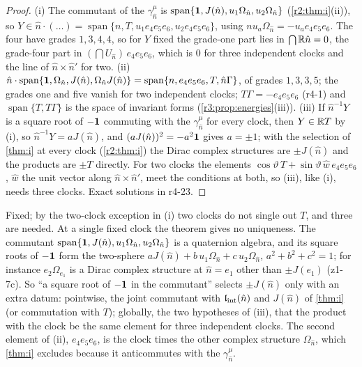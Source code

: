 \begin{proof}
(i) The commutant of the $\gamma^\mu_{\hat n}$ is $\operatorname{span}\{\mathbf 1,J(\hat n),u_1\Omega_{\hat n},u_2\Omega_{\hat n}\}$ (\cref{r2:thm:i}(ii)), so $Y\in \hat n\cdot(\ldots)=\operatorname{span}\{n,T,u_1e_4e_5e_6,u_2e_4e_5e_6\}$, using
$nu_a\Omega_{\hat n}=-u_ae_4e_5e_6$. The four have grades $1,3,4,4$, so for $Y$ fixed the grade-one part lies in $\bigcap\mathbb{R} \hat n=0$, the grade-four part in $(\bigcap U_{\hat n})\,e_4e_5e_6$,
which is $0$ for three independent clocks and the line of $\hat n\times \hat n'$ for two. (ii) $\hat n\cdot\operatorname{span}\{\mathbf 1,\Omega_{\hat n},J(\hat n),\Omega_{\hat n}J(\hat n)\}=\operatorname{span}\{n,e_4e_5e_6,T,\hat n\Gamma\}$, of grades
$1,3,3,5$; the grades one and five vanish for two independent clocks; $T\Gamma=-e_4e_5e_6$ (r4-1) and $\operatorname{span}\{T,T\Gamma\}$ is the space of invariant forms
(\cref{r3:prop:energies}(iii)). (iii) If $\hat n^{-1}Y$ is a square root of $-\mathbf 1$ commuting with the $\gamma^\mu_{\hat n}$ for every clock, then $Y\in\mathbb{R} T$ by (i), so
$\hat n^{-1}Y=aJ(\hat n)$, and $(aJ(\hat n))^2=-a^2\mathbf 1$ gives $a=\pm1$; with the selection of \cref{thm:i} at every clock (\cref{r2:thm:i}) the Dirac
complex structures are $\pm J(\hat n)$ and the products are $\pm T$ directly. For two clocks the elements $\cos\vartheta\,T+\sin\vartheta\,\hat w\,e_4e_5e_6$,
$\hat w$ the unit vector along $\hat n\times \hat n'$, meet the conditions at both, so (iii), like (i), needs three clocks. Exact solutions in r4-23.
\end{proof}

Fixed; by the two-clock exception in (i) two clocks do not single out $T$, and three are needed. At a single fixed clock the theorem gives no
uniqueness. The commutant $\operatorname{span}\{\mathbf 1,J(\hat n),u_1\Omega_{\hat n},u_2\Omega_{\hat n}\}$ is a quaternion algebra, and its square roots of $-\mathbf 1$ form the
two-sphere $aJ(\hat n)+b\,u_1\Omega_{\hat n}+c\,u_2\Omega_{\hat n}$, $a^2+b^2+c^2=1$; for instance $e_2\Omega_{e_1}$ is a Dirac complex structure at $\hat n=e_1$ other than
$\pm J(e_1)$ (z1-7c). So ``a square root of $-\mathbf 1$ in the commutant'' selects $\pm J(\hat n)$ only with an extra datum: pointwise, the
joint commutant with $\mathfrak l_{\rm int}(\hat n)$ and $J(\hat n)$ of \cref{thm:i} (or commutation with $T$); globally, the two hypotheses of (iii),
that the product with the clock be the same element for three independent clocks. The second element of (ii), $e_4e_5e_6$, is the
clock times the other complex structure $\Omega_{\hat n}$, which \cref{thm:i} excludes because it anticommutes with the $\gamma^\mu_{\hat n}$.

